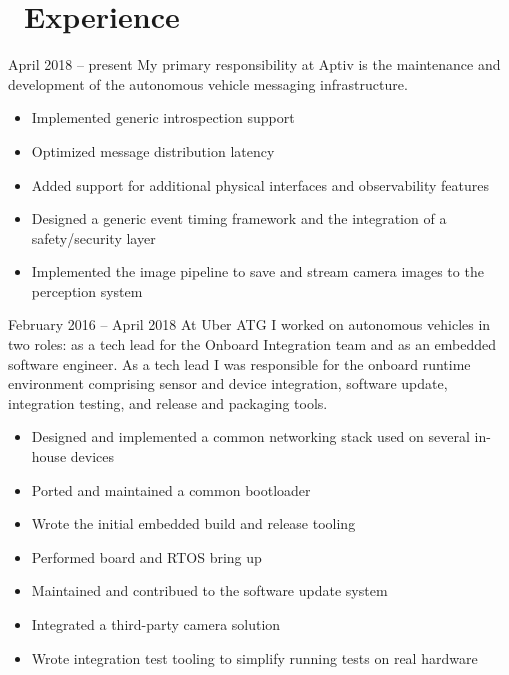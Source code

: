 \documentclass{resume}
\begin{document}


 
\section{\faWrench\ Experience}
          {April 2018 -- present}
My primary responsibility at Aptiv is the maintenance and development of the autonomous vehicle
messaging infrastructure.
\begin{itemize}
  \item Implemented generic introspection support
  \item Optimized message distribution latency
  \item Added support for additional physical interfaces and observability features
  \item Designed a generic event timing framework and the integration of a safety/security layer
  \item Implemented the image pipeline to save and stream camera images to the perception system
\end{itemize}
\vspace{3mm}

          {February 2016 -- April 2018}
At Uber ATG I worked on autonomous vehicles in two roles: as a tech lead for the Onboard Integration team and
as an embedded software engineer.  As a tech lead I was responsible for the onboard runtime
environment comprising sensor and device integration, software update, integration testing, and
release and packaging tools.
\begin{itemize}
  \item Designed and implemented a common networking stack used on several in-house devices
  \item Ported and maintained a common bootloader
  \item Wrote the initial embedded build and release tooling
  \item Performed board and RTOS bring up
  \item Maintained and contribued to the software update system
  \item Integrated a third-party camera solution
  \item Wrote integration test tooling to simplify running tests on real hardware
\end{itemize}
\vspace{3mm}
\end{document}
